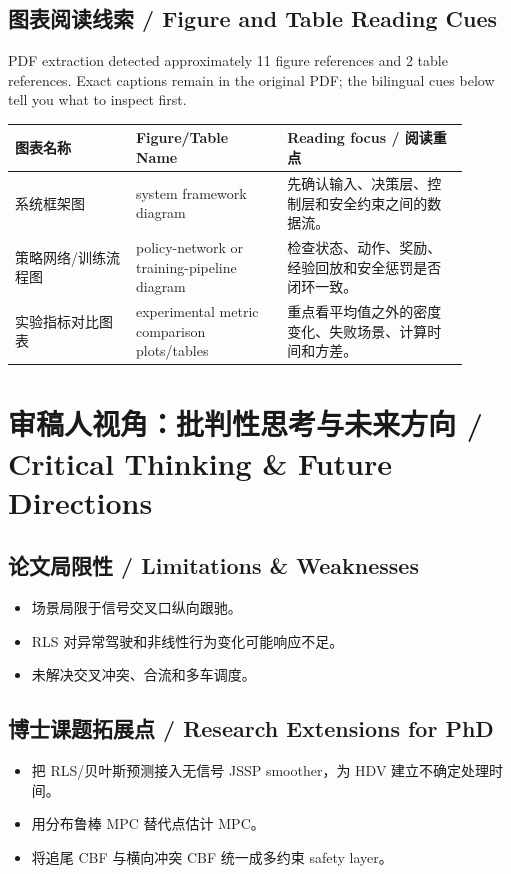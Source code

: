 \documentclass[UTF8,a4paper,11pt,fontset=fandol]{ctexart}
\begin{document}
\subsection{图表阅读线索 / Figure and Table Reading Cues}
PDF extraction detected approximately 11 figure references and 2 table references. Exact captions remain in the original PDF; the bilingual cues below tell you what to inspect first.

\begin{longtable}{p{0.24\linewidth}p{0.30\linewidth}p{0.36\linewidth}}
\toprule
图表名称 & Figure/Table Name & Reading focus / 阅读重点\\
\midrule
系统框架图 & system framework diagram & 先确认输入、决策层、控制层和安全约束之间的数据流。 \\
策略网络/训练流程图 & policy-network or training-pipeline diagram & 检查状态、动作、奖励、经验回放和安全惩罚是否闭环一致。 \\
实验指标对比图表 & experimental metric comparison plots/tables & 重点看平均值之外的密度变化、失败场景、计算时间和方差。 \\
\bottomrule
\end{longtable}

\section{审稿人视角：批判性思考与未来方向 / Critical Thinking \& Future Directions}
\subsection{论文局限性 / Limitations \& Weaknesses}
\begin{itemize}
\item 场景局限于信号交叉口纵向跟驰。
\item RLS 对异常驾驶和非线性行为变化可能响应不足。
\item 未解决交叉冲突、合流和多车调度。
\end{itemize}


\subsection{博士课题拓展点 / Research Extensions for PhD}
\begin{itemize}
\item 把 RLS/贝叶斯预测接入无信号 JSSP smoother，为 HDV 建立不确定处理时间。
\item 用分布鲁棒 MPC 替代点估计 MPC。
\item 将追尾 CBF 与横向冲突 CBF 统一成多约束 safety layer。
\end{itemize}
\end{document}
